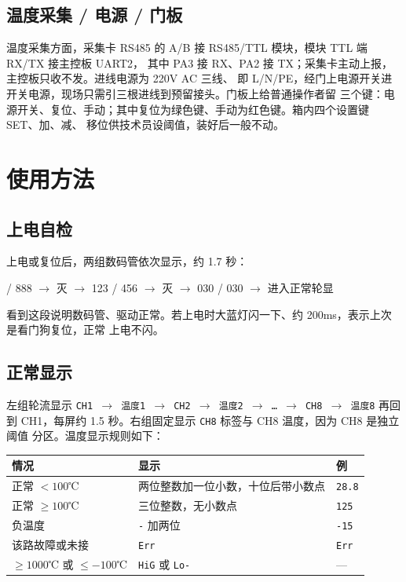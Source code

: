 \documentclass[a4paper,11pt]{ctexart}
\begin{document}
\subsection{温度采集 / 电源 / 门板}
温度采集方面，采集卡 RS485 的 A/B 接 RS485/TTL 模块，模块 TTL 端 RX/TX 接主控板 UART2，
其中 PA3 接 RX、PA2 接 TX；采集卡主动上报，主控板只收不发。进线电源为 220V AC 三线、
即 L/N/PE，经门上电源开关进开关电源，现场只需引三根进线到预留接头。门板上给普通操作者留
三个键：电源开关、复位、手动；其中复位为绿色键、手动为红色键。箱内四个设置键 SET、加、减、
移位供技术员设阈值，装好后一般不动。

\section{使用方法}
\subsection{上电自检}
上电或复位后，两组数码管依次显示，约 1.7 秒：
\begin{center} / 888 $\to$ 灭 $\to$ 123 / 456 $\to$ 灭 $\to$ 030 / 030 $\to$ 进入正常轮显
\end{center}
看到这段说明数码管、驱动正常。若上电时大蓝灯闪一下、约 200ms，表示上次是看门狗复位，正常
上电不闪。

\subsection{正常显示}
左组轮流显示 \texttt{CH1 $\to$ 温度1 $\to$ CH2 $\to$ 温度2 $\to$ \dots{} $\to$ CH8 $\to$ 温度8}
再回到 CH1，每屏约 1.5 秒。右组固定显示 \texttt{CH8} 标签与 CH8 温度，因为 CH8 是独立阈值
分区。温度显示规则如下：
\renewcommand{\arraystretch}{1.3}
\begin{center}
\begin{tabular}{|l|l|l|}
\hline
情况 & 显示 & 例\\
\hline
正常 $<100$℃ & 两位整数加一位小数，十位后带小数点 & \texttt{28.8}\\
\hline
正常 $\ge 100$℃ & 三位整数，无小数点 & \texttt{125}\\
\hline
负温度 & \texttt{-} 加两位 & \texttt{-15}\\
\hline
该路故障或未接 & \texttt{Err} & \texttt{Err}\\
\hline
$\ge 1000$℃ 或 $\le -100$℃ & \texttt{HiG} 或 \texttt{Lo-} & ---\\
\hline
\end{tabular}
\end{center}
\renewcommand{\arraystretch}{1.0}
\end{document}
